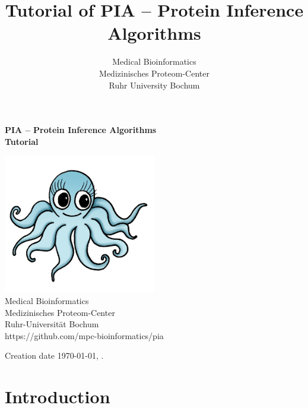 \documentclass[a4paper,11pt,twoside]{article}
\title{Tutorial of PIA -- Protein Inference Algorithms}
\author{Medical Bioinformatics\\
	Medizinisches Proteom-Center\\
	Ruhr University Bochum}
\begin{document}
\thispagestyle{empty}
\begin{titlepage}
	\vspace*{\fill}
	\begin{adjustwidth}{-2cm}{-2cm}
		\begin{center}
			{\huge \textbf{PIA -- Protein Inference Algorithms\\
					Tutorial}\\[2cm]}
		\end{center}
	\end{adjustwidth}

	\begin{center}
		\includegraphics[width=0.5\textwidth]{graphics/pia_logo_big}\\[2cm]

		{\large Medical Bioinformatics\\
			Medizinisches Proteom-Center\\
			Ruhr-Universität Bochum\\[0.5cm]}
		{\large https://github.com/mpc-bioinformatics/pia\\[0.1cm]}
	\end{center}

	\vspace*{2cm}
	\begin{center}
		Creation date \today{}, \currenttime{}.
	\end{center}
	\vspace*{\fill}
\end{titlepage}


\tableofcontents
\newpage


\section{Introduction}
\end{document}
